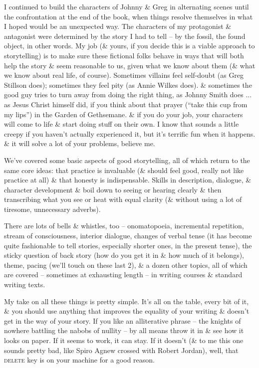 \documentclass{article}
\numberwithin{equation}{section}
\begin{document}
I continued to build the characters of Johnny \& Greg in alternating scenes until the confrontation at the end of the book, when things resolve themselves in what I hoped would be an unexpected way. The characters of my protagonist \& antagonist were determined by the story I had to tell -- by the fossil, the found object, in other words. My job (\& yours, if you decide this is a viable approach to storytelling) is to make sure these fictional folks behave in ways that will both help the story \& seem reasonable to us, given what we know about them (\& what we know about real life, of course). Sometimes villains feel self-doubt (as Greg Stillson does); sometimes they feel pity (as Annie Wilkes does). \& sometimes the good guy tries to turn away from doing the right thing, as Johnny Smith does $\ldots$ as Jesus Christ himself did, if you think about that prayer (``take this cup from my lips'') in the Garden of Gethsemane. \& if you do your job, your characters will come to life \& start doing stuff on their own. I know that sounds a little creepy if you haven't actually experienced it, but it's terrific fun when it happens. \& it will solve a lot of your problems, believe me.

 We've covered some basic aspects of good storytelling, all of which return to the same core ideas: that practice is invaluable (\& should feel good, really not like practice at all) \& that honesty is indispensable. Skills in description, dialogue, \& character development \& boil down to seeing or hearing clearly \& then transcribing what you see or heat with equal clarity (\& without using a lot of tiresome, unnecessary adverbs).

There are lots of bells \& whistles, too -- onomatopoeia, incremental repetition, stream of consciousness, interior dialogue, changes of verbal tense (it has become quite fashionable to tell stories, especially shorter ones, in the present tense), the sticky question of back story (how do you get it in \& how much of it belongs), theme, pacing (we'll touch on these last 2), \& a dozen other topics, all of which are covered -- sometimes at exhausting length -- in writing courses \& standard writing texts.

My take on all these things is pretty simple. It's all on the table, every bit of it, \& you should use anything that improves the equality of your writing \& doesn't get in the way of your story. If you like an alliterative phrase -- the knights of nowhere battling the nabobs of nullity -- by all means throw it in \& see how it looks on paper. If it seems to work, it can stay. If it doesn't (\& to me this one sounds pretty bad, like Spiro Agnew crossed with Robert Jordan), well, that \textsc{delete} key is on your machine for a good reason.
\end{document}
